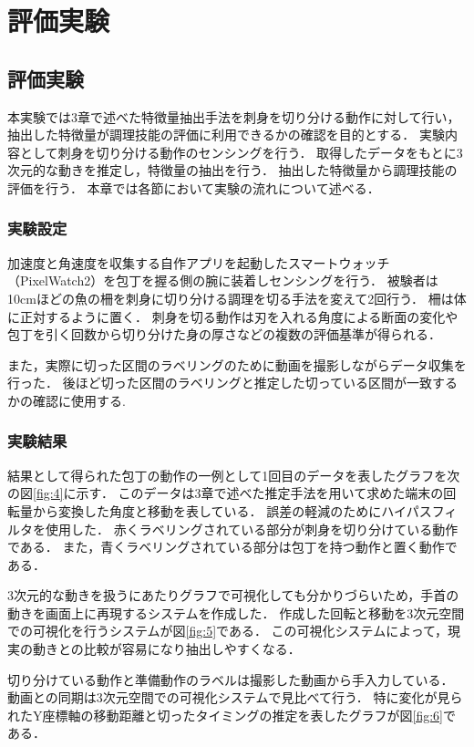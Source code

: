 \chapter{評価実験}
\section{評価実験}
本実験では3章で述べた特徴量抽出手法を刺身を切り分ける動作に対して行い，抽出した特徴量が調理技能の評価に利用できるかの確認を目的とする．
実験内容として刺身を切り分ける動作のセンシングを行う．
取得したデータをもとに3次元的な動きを推定し，特徴量の抽出を行う．
抽出した特徴量から調理技能の評価を行う．
本章では各節において実験の流れについて述べる．
\subsection{実験設定}
加速度と角速度を収集する自作アプリを起動したスマートウォッチ（PixelWatch2）を包丁を握る側の腕に装着しセンシングを行う．
被験者は10cmほどの魚の柵を刺身に切り分ける調理を切る手法を変えて2回行う．
柵は体に正対するように置く．
刺身を切る動作は刃を入れる角度による断面の変化や包丁を引く回数から切り分けた身の厚さなどの複数の評価基準が得られる．

また，実際に切った区間のラベリングのために動画を撮影しながらデータ収集を行った．
後ほど切った区間のラベリングと推定した切っている区間が一致するかの確認に使用する.
\subsection{実験結果}
結果として得られた包丁の動作の一例として1回目のデータを表したグラフを次の図\ref{fig:4}に示す．
このデータは3章で述べた推定手法を用いて求めた端末の回転量から変換した角度と移動を表している．
誤差の軽減のためにハイパスフィルタを使用した．
赤くラベリングされている部分が刺身を切り分けている動作である．
また，青くラベリングされている部分は包丁を持つ動作と置く動作である．

3次元的な動きを扱うにあたりグラフで可視化しても分かりづらいため，手首の動きを画面上に再現するシステムを作成した．
作成した回転と移動を3次元空間での可視化を行うシステムが図\ref{fig:5}である．
この可視化システムによって，現実の動きとの比較が容易になり抽出しやすくなる．

切り分けている動作と準備動作のラベルは撮影した動画から手入力している．
動画との同期は3次元空間での可視化システムで見比べて行う．
特に変化が見られたY座標軸の移動距離と切ったタイミングの推定を表したグラフが図\ref{fig:6}である．

